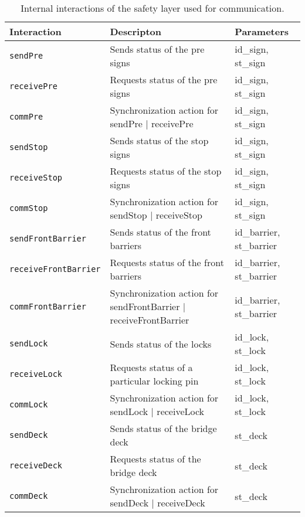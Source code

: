 \begin{table}[htb]%
\begin{tabular}{lll}
			\textbf{Interaction} &	\textbf{Descripton}	&	\textbf{Parameters}\\
      \hline
      
      \texttt{sendPre} & Sends status of the pre signs & id\_sign, st\_sign\\
      \texttt{receivePre} & Requests status of the pre signs & id\_sign, st\_sign\\
      \texttt{commPre} & Synchronization action for sendPre $\mid$ receivePre & id\_sign, st\_sign\\
      
      \texttt{sendStop} & Sends status of the stop signs & id\_sign, st\_sign\\
      \texttt{receiveStop} & Requests status of the stop signs & id\_sign, st\_sign\\
      \texttt{commStop} & Synchronization action for sendStop $\mid$ receiveStop & id\_sign, st\_sign\\
      
      \texttt{sendFrontBarrier} & Sends status of the front barriers & id\_barrier, st\_barrier\\
      \texttt{receiveFrontBarrier} & Requests status of the front barriers & id\_barrier, st\_barrier\\
      \texttt{commFrontBarrier} & Synchronization action for sendFrontBarrier $\mid$ receiveFrontBarrier & id\_barrier, st\_barrier\\
      
      \texttt{sendLock} & Sends status of the locks & id\_lock, st\_lock\\
      \texttt{receiveLock} & Requests status of a particular locking pin & id\_lock, st\_lock\\
      \texttt{commLock} & Synchronization action for sendLock $\mid$ receiveLock & id\_lock, st\_lock\\
      
      \texttt{sendDeck} & Sends status of the bridge deck & st\_deck\\
      \texttt{receiveDeck} & Requests status of the bridge deck & st\_deck\\
      \texttt{commDeck} & Synchronization action for sendDeck $\mid$ receiveDeck & st\_deck\\
\end{tabular}
\caption{Internal interactions of the safety layer used for communication.}
\label{tab:process}
\end{table}
